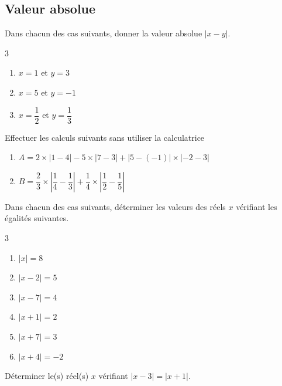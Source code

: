{\newpage

\subsection*{Valeur absolue}

\begin{Exercice}
Dans chacun des cas suivants, donner la valeur absolue $|x - y|$.
\vspace{-0.5cm}
\begin{multicols}{3}
\begin{enumerate}
    \item $x = 1$ et $y = 3$
    \item $x = 5$ et $y = -1$
    \item $x = \dfrac{1}{2}$ et $y = \dfrac{1}{3}$
\end{enumerate}
\end{multicols}
\end{Exercice}

\begin{Exercice}
Effectuer les calculs suivants sans utiliser la calculatrice
\begin{enumerate}
    \item $A = 2 \times |1 - 4| - 5 \times |7 - 3| + |5 - (-1)| \times |-2 - 3|$
    \item $B = \dfrac{2}{3} \times \left| \dfrac{1}{4} - \dfrac{1}{3} \right| + \dfrac{1}{4} \times \left| \dfrac{1}{2} - \dfrac{1}{5} \right|$
\end{enumerate}
\end{Exercice}

\begin{Exercice}
Dans chacun des cas suivants, déterminer les valeurs des réels $x$ vérifiant les égalités suivantes.
\vspace{-0.5cm}
\begin{multicols}{3}
\begin{enumerate}
    \item $|x| = 8$
    \item $|x - 2| = 5$
    \item $|x - 7| = 4$
    \item $|x + 1| = 2$
    \item $|x + 7| = 3$
    \item $|x + 4| = -2$
\end{enumerate}
\end{multicols}
\end{Exercice}

\begin{Exercice}
Déterminer le(s) réel(s) $x$ vérifiant $|x - 3| = |x + 1|$.
\end{Exercice}

}
